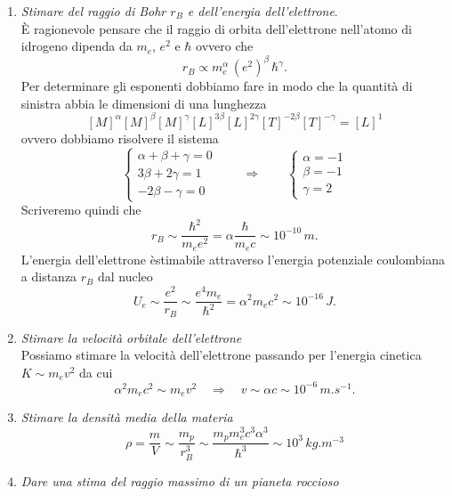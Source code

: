 \begin{enumerate}
	\item \emph{Stimare del raggio di Bohr $ r_B $ e dell'energia dell'elettrone}. \\
	È ragionevole pensare che il raggio di orbita dell'elettrone nell'atomo di idrogeno dipenda da $ m_e $, $ e^2 $ e $ \hbar $ ovvero che \[r_B \propto m_e^{\alpha} \, (e^2)^{\beta} \,  \hbar^{\gamma}.\] Per determinare gli esponenti dobbiamo fare in modo che la quantità di sinistra abbia le dimensioni di una lunghezza
	\[[M]^{\alpha}[M]^{\beta}[M]^{\gamma}[L]^{3\beta}[L]^{2\gamma}[T]^{-2\beta}[T]^{-\gamma} = [L]^1\]
	ovvero dobbiamo risolvere il sistema
	\[
	\begin{cases*}
	\alpha + \beta + \gamma = 0 \\
	3\beta + 2\gamma = 1 \\
	-2\beta - \gamma = 0	 
	\end{cases*}
	\qquad \Rightarrow \qquad
	\begin{cases*}
	\alpha = -1 \\
	\beta = -1 \\
	\gamma = 2 
	\end{cases*}\]
	Scriveremo quindi che 
	\begin{equation}
	r_B \sim \frac{\hbar^2}{m_e e^2} = \alpha \frac{\hbar}{m_e c} \sim 10^{-10} \, \si{m}.
	\end{equation}
	L'energia dell'elettrone èstimabile attraverso l'energia potenziale coulombiana a distanza $ r_B $ dal nucleo
	\begin{equation}
	U_e \sim \frac{e^2}{r_B} \sim \frac{e^4 m_e}{\hbar^2} = \alpha^2 m_e c^2 \sim 10^{-16} \, \si{J}.
	\end{equation}
	\item \emph{Stimare la velocità orbitale dell'elettrone} \\
	Possiamo stimare la velocità dell'elettrone passando per l'energia cinetica $ K \sim m_e v^2 $ da cui 
	\begin{equation}
	\alpha^2 m_e c^2 \sim m_e v^2 \quad \Rightarrow \quad v \sim \alpha c \sim 10^{-6} \, \si{m.s^{-1}}.
	\end{equation}
	\item \emph{Stimare la densità media della materia} \\
	\begin{equation}
	\rho = \frac{m}{V} \sim \frac{m_p}{r_B^3} \sim \frac{m_p m_e^3 c^3 \alpha^3}{\hbar^3} \sim 10^3 \, \si{kg.m^{-3}}
	\end{equation}
	\item \emph{Dare una stima del raggio massimo di un pianeta roccioso} \\

\end{enumerate}
